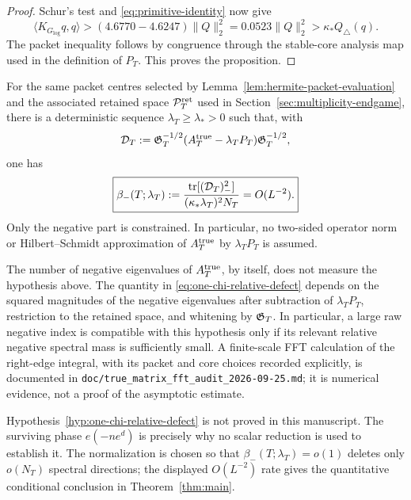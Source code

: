 \begin{proof}
Schur's test and \eqref{eq:primitive-identity} now give
\[
\langle K_{G_{\log}}q,q\rangle
>(4.6770-4.6247)\|Q\|_2^2
=0.0523\|Q\|_2^2
>\kappa_*Q_\triangle(q).
\]
The packet inequality follows by congruence through the stable-core analysis
map used in the definition of $P_T$.  This proves the proposition.
\end{proof}

\begin{hypothesis}
\label{hyp:one-chi-relative-defect}
For the same packet centres selected by Lemma~\ref{lem:hermite-packet-evaluation}
and the associated retained space $\mathcal P_T^{\rm ret}$ used in
Section~\ref{sec:multiplicity-endgame}, there is a deterministic sequence
$\lambda_T\ge\lambda_*>0$ such that, with
\begin{equation}
\mathcal D_T
:=\mathfrak G_T^{-1/2}(A_T^{\rm true}-\lambda_TP_T)\mathfrak G_T^{-1/2},
\label{eq:true-model-relative-defect}
\end{equation}
one has
\begin{equation}
\boxed{
\beta_-(T;\lambda_T)
:=\frac{\operatorname{tr}[(\mathcal D_T)_-^2]}
{(\kappa_*\lambda_T)^2N_T}
=O(L^{-2}).}
\label{eq:one-chi-relative-defect}
\end{equation}
Only the negative part is constrained.  In particular, no two-sided operator
norm or Hilbert--Schmidt approximation of $A_T^{\rm true}$ by
$\lambda_TP_T$ is assumed.
\end{hypothesis}

\begin{remark}
The number of negative eigenvalues of $A_T^{\rm true}$, by itself, does not
measure the hypothesis above.  The quantity in
\eqref{eq:one-chi-relative-defect} depends on the squared magnitudes of the
negative eigenvalues after subtraction of $\lambda_TP_T$, restriction to the
retained space, and whitening by $\mathfrak G_T$.  In particular, a large raw
negative index is compatible with this hypothesis only if its relevant
relative negative spectral mass is sufficiently small.  A finite-scale FFT
calculation of the right-edge integral, with its packet and core choices
recorded explicitly, is documented in
\texttt{doc/true\_matrix\_fft\_audit\_2026-09-25.md}; it is numerical
evidence, not a proof of the asymptotic estimate.
\end{remark}

\begin{remark}
Hypothesis~\ref{hyp:one-chi-relative-defect} is not proved in this manuscript.
The surviving phase $e(-ne^d)$ is precisely why no scalar reduction is used to
establish it.  The normalization is chosen so that
$\beta_-(T;\lambda_T)=o(1)$ deletes only $o(N_T)$ spectral directions; the
displayed $O(L^{-2})$ rate gives the quantitative conditional conclusion in
Theorem~\ref{thm:main}.
\end{remark}

